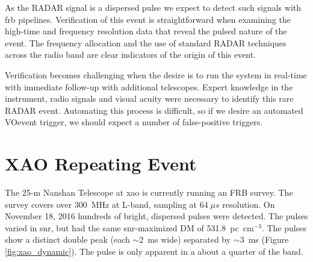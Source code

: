 \documentclass[a4paper,fleqn,usenatbib]{mnras}
\begin{document}
As the RADAR signal is a dispersed pulse we expect to detect such signals with
\gls{frb} pipelines.  Verification of this event is straightforward when
examining the high-time and frequency resolution data that reveal the pulsed
nature of the event.  The frequency allocation and the use of standard RADAR
techniques across the radio band are clear indicators of the origin of this
event.  

Verification becomes challenging when the desire is to run the system in
real-time with immediate follow-up with additional telescopes.  Expert knowledge
in the instrument, radio signals and visual acuity were necessary to identify
this rare RADAR event.  Automating this process is difficult, so if we desire an
automated VOevent trigger, we should expect a number of false-positive triggers.

\section{XAO Repeating Event}
\label{sec:xao_event}

The 25-m Nanshan Telescope at \gls{xao} is currently running an FRB survey. The
survey covers over 300~MHz at L-band, sampling at $64 \; \mu s$ resolution. On
November 18, 2016 hundreds of bright, dispersed pulses were detected. The pulses
varied in \gls{snr}, but had the same \gls{snr}-maximized DM of 531.8~pc~cm$^{-3}$. The
pulses show a distinct double peak (each $\sim 2$~ms wide) separated by $\sim
3$~ms (Figure \ref{fig:xao_dynamic}). The pulse is only apparent in a about a
quarter of the band.
\end{document}

